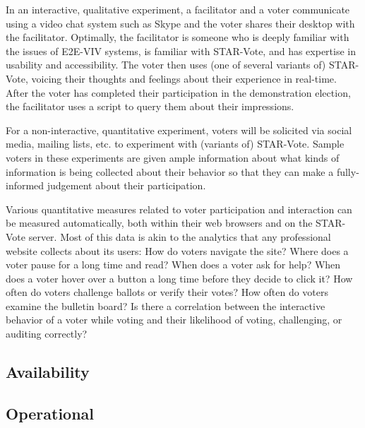 In an interactive, qualitative experiment, a facilitator and a voter
communicate using a video chat system such as Skype and the voter
shares their desktop with the facilitator. Optimally, the facilitator
is someone who is deeply familiar with the issues of E2E-VIV systems,
is familiar with STAR-Vote, and has expertise in usability and
accessibility. The voter then uses (one of several variants of)
STAR-Vote, voicing their thoughts and feelings about their experience
in real-time. After the voter has completed their participation in the
demonstration election, the facilitator uses a script to query them
about their impressions.

For a non-interactive, quantitative experiment, voters will be
solicited via social media, mailing lists, etc. to experiment with
(variants of) STAR-Vote. Sample voters in these experiments are given
ample information about what kinds of information is being collected
about their behavior so that they can make a fully-informed judgement
about their participation.

Various quantitative measures related to voter participation and
interaction can be measured automatically, both within their web
browsers and on the STAR-Vote server. Most of this data is akin to the
analytics that any professional website collects about its users: How
do voters navigate the site?  Where does a voter pause for a long time
and read?  When does a voter ask for help?  When does a voter hover
over a button a long time before they decide to click it?  How often
do voters challenge ballots or verify their votes?  How often do
voters examine the bulletin board?  Is there a correlation between the
interactive behavior of a voter while voting and their likelihood of
voting, challenging, or auditing correctly?


\subsection{Availability}


\subsection{Operational}

